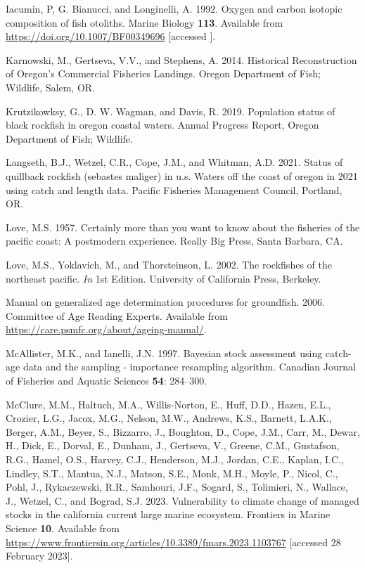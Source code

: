 \documentclass[11pt,
  letterpaper,
]{article}
\newlength{\cslhangindent}
\newenvironment{CSLReferences}[2] %
 {%
  \setlength{\parindent}{0pt}
  \ifodd #1 \everypar{\setlength{\hangindent}{\cslhangindent}}\ignorespaces\fi
  \ifnum #2 > 0
  \setlength{\parskip}{#2\baselineskip}
  \fi
 }%
 {}
\begin{document}
\begin{CSLReferences}{1}{0}
\leavevmode{}%
Iacumin, P, G. Bianucci, and Longinelli, A. 1992. Oxygen and carbon isotopic composition of fish otoliths. Marine Biology \textbf{113}. Available from \url{https://doi.org/10.1007/BF00349696} {[}accessed {]}.

\leavevmode{}%
Karnowski, M., Gertseva, V.V., and Stephens, A. 2014. Historical {Reconstruction} of {Oregon}'s {Commercial} {Fisheries} {Landings}. Oregon Department of Fish; Wildlife, Salem, OR.

\leavevmode{}%
Krutzikowksy, G., D. W. Wagman, and Davis, R. 2019. Population status of black rockfish in oregon coastal waters. Annual Progress Report, Oregon Department of Fish; Wildlife.

\leavevmode{}%
Langseth, B.J., Wetzel, C.R., Cope, J.M., and Whitman, A.D. 2021. Status of quillback rockfish (sebastes maliger) in u.s. Waters off the coast of oregon in 2021 using catch and length data. Pacific Fisheries Management Council, Portland, {OR}.

\leavevmode{}%
Love, M.S. 1957. Certainly more than you want to know about the fisheries of the pacific coast: A postmodern experience. Really Big Press, Santa Barbara, CA.

\leavevmode{}%
Love, M.S., Yoklavich, M., and Thorsteinson, L. 2002. The rockfishes of the northeast pacific. \emph{In} 1st Edition. University of California Press, Berkeley.

\leavevmode{}%
Manual on generalized age determination procedures for groundfish. 2006. Committee of Age Reading Experts. Available from \url{https://care.psmfc.org/about/ageing-manual/}.

\leavevmode{}%
McAllister, M.K., and Ianelli, J.N. 1997. Bayesian stock assessment using catch-age data and the sampling - importance resampling algorithm. Canadian Journal of Fisheries and Aquatic Sciences \textbf{54}: 284--300.

\leavevmode{}%
McClure, M.M., Haltuch, M.A., Willis-Norton, E., Huff, D.D., Hazen, E.L., Crozier, L.G., Jacox, M.G., Nelson, M.W., Andrews, K.S., Barnett, L.A.K., Berger, A.M., Beyer, S., Bizzarro, J., Boughton, D., Cope, J.M., Carr, M., Dewar, H., Dick, E., Dorval, E., Dunham, J., Gertseva, V., Greene, C.M., Gustafson, R.G., Hamel, O.S., Harvey, C.J., Henderson, M.J., Jordan, C.E., Kaplan, I.C., Lindley, S.T., Mantua, N.J., Matson, S.E., Monk, M.H., Moyle, P., Nicol, C., Pohl, J., Rykaczewski, R.R., Samhouri, J.F., Sogard, S., Tolimieri, N., Wallace, J., Wetzel, C., and Bograd, S.J. 2023. Vulnerability to climate change of managed stocks in the california current large marine ecosystem. Frontiers in Marine Science \textbf{10}. Available from \url{https://www.frontiersin.org/articles/10.3389/fmars.2023.1103767} {[}accessed 28 February 2023{]}.


\end{CSLReferences}
\end{document}
